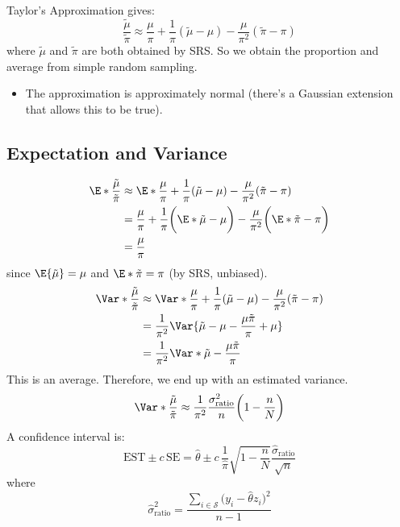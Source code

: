 Taylor's Approximation gives:
\[ \frac{\tilde{\mu}}{\tilde{\pi}}\approx \frac{\mu}{\pi}+\frac{1}{\pi}(\tilde{\mu}-\mu)-\frac{\mu}{\pi^2}(\tilde{\pi}-\pi)  \]
where $ \tilde{\mu} $ and $ \tilde{\pi} $ are both obtained by SRS\@. So we obtain the proportion and average from simple random sampling.
\begin{itemize}
    \item The approximation is approximately normal (there's a Gaussian extension that allows
          this to be true).
\end{itemize}
\subsection*{Expectation and Variance}
\begin{align*}
    \E*{\frac{\tilde{\mu}}{\tilde{\pi}}}
     & \approx \E*{\frac{\mu}{\pi}+\frac{1}{\pi}(\tilde{\mu}-\mu)-\frac{\mu}{\pi^2}(\tilde{\pi}-\pi)}                         \\
     & =\frac{\mu}{\pi}+\frac{1}{\pi} \biggl(\E*{\tilde{\mu}}-\mu\biggr)-\frac{\mu}{\pi^2} \biggl(\E*{\tilde{\pi}}-\pi\biggr) \\
     & =\frac{\mu}{\pi}
\end{align*}
since $ \E{\tilde{\mu}}=\mu $ and $ \E*{\tilde{\pi}}=\pi $ (by SRS, unbiased).
\begin{align*}
    \Var*{\frac{\tilde{\mu}}{\tilde{\pi}}}
     & \approx \Var*{\frac{\mu}{\pi}+\frac{1}{\pi}(\tilde{\mu}-\mu)-\frac{\mu}{\pi^2}(\tilde{\pi}-\pi)} \\
     & =\frac{1}{\pi^2} \Var{\tilde{\mu}-\mu-\frac{\mu\tilde{\pi}}{\pi}+\mu}                            \\
     & =\frac{1}{\pi^2} \Var*{\tilde{\mu}-\frac{\mu \tilde{\pi}}{\pi}}
\end{align*}
This is an average. Therefore, we end up with an estimated variance.
\[  \Var*{\frac{\tilde{\mu}}{\tilde{\pi}}}\approx \frac{1}{\pi^2} \frac{\sigma^2_{\text{ratio}}}{n}\biggl(1-\frac{n}{N}\biggr)  \]
A confidence interval is:
\[ \text{EST}\pm c\,\text{SE}=\hat{\theta}\pm c\, \frac{1}{\hat{\pi}} \sqrt{1-\frac{n}{N}}\frac{\hat{\sigma}_{\text{ratio}}}{\sqrt{n}}  \]
where
\[ \hat{\sigma}_{\text{ratio}}^2=\frac{\sum_{i\in\mathcal{S}}\bigl(y_i-\hat{\theta}z_i\bigr)^2 }{n-1}  \]
